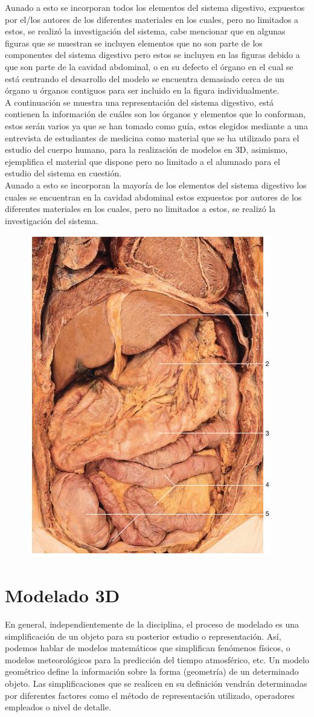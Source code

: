 Aunado a esto se incorporan todos los elementos del sistema digestivo, expuestos por el/los autores de los diferentes materiales en los cuales, pero no limitados 
a estos, se realizó la investigación del sistema, cabe mencionar que en algunas figuras que se muestran se incluyen elementos que no son parte de los componentes 
del sistema digestivo pero estos se incluyen en las figuras debido a que son parte de la cavidad abdominal, o en su defecto el órgano en el cual se está centrando 
el desarrollo del modelo se encuentra demasiado cerca de un órgano u órganos contiguos para ser incluido en la figura individualmente.\\
A continuación se muestra una representación del sistema digestivo, está contienen la información de cuáles son los órganos y elementos que lo conforman, estos serán 
varios ya que se han tomado como guía, estos elegidos mediante a una entrevista de estudiantes de medicina como material que se ha utilizado para el estudio del cuerpo 
humano, para la realización de modelos en 3D, asimismo, ejemplifica el material que dispone pero no limitado a el alumnado para el estudio del sistema en cuestión.\\
Aunado a esto se incorporan la mayoría de los elementos del sistema digestivo los cuales se encuentran en la cavidad abdominal estos expuestos por autores de los 
diferentes materiales en los cuales, pero no limitados a estos, se realizó la investigación del sistema.\\
\begin{figure}[H]
	\begin{center}
 		\includegraphics[width = .3\textwidth]{source/images/image72.png}
	\end{center} 
\end{figure}

\section{Modelado 3D}
En general, independientemente de la disciplina, el proceso de modelado es una simplificación de un objeto para su posterior estudio o representación. Así, podemos hablar de modelos matemáticos que simplifican fenómenos físicos, o modelos meteorológicos para la predicción del tiempo atmosférico, etc. Un modelo geométrico define la información sobre la forma (geometría) de un determinado objeto. Las simplificaciones que se realicen en su definición vendrán determinadas por diferentes factores como el método de representación utilizado, operadores empleados o nivel de detalle.\cite{web13} \\


